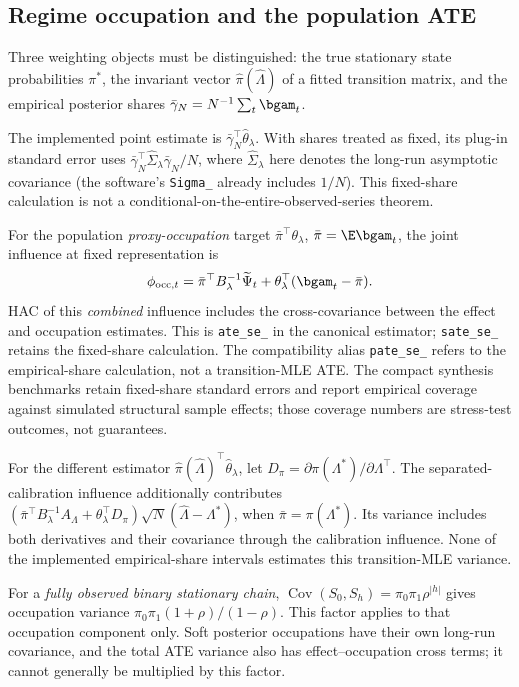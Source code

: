 \subsection{Regime occupation and the population ATE}
\label{app:proof_prop6}
Three weighting objects must be distinguished: the true stationary state probabilities $\pi^*$, the invariant vector $\hat\pi(\hat\Lambda)$ of a fitted transition matrix, and the empirical posterior shares $\bar\gamma_N=N^{-1}\sum_t\bgam_t$.

The implemented point estimate is $\bar\gamma_N^\top\hat\theta_\lambda$. With shares treated as fixed, its plug-in standard error uses $\bar\gamma_N^\top\hat\Sigma_\lambda\bar\gamma_N/N$, where $\hat\Sigma_\lambda$ here denotes the long-run asymptotic covariance (the software's \texttt{Sigma\_} already includes $1/N$). This fixed-share calculation is not a conditional-on-the-entire-observed-series theorem.

For the population \emph{proxy-occupation} target $\bar\pi^\top\theta_\lambda$, $\bar\pi=\E\bgam_t$, the joint influence at fixed representation is
\[
\phi_{{\rm occ},t}=\bar\pi^\top B_\lambda^{-1}\widetilde\Psi_t
+\theta_\lambda^\top(\bgam_t-\bar\pi).
\]
HAC of this \emph{combined} influence includes the cross-covariance between the effect and occupation estimates. This is \texttt{ate\_se\_} in the canonical estimator; \texttt{sate\_se\_} retains the fixed-share calculation. The compatibility alias \texttt{pate\_se\_} refers to the empirical-share calculation, not a transition-MLE ATE. The compact synthesis benchmarks retain fixed-share standard errors and report empirical coverage against simulated structural sample effects; those coverage numbers are stress-test outcomes, not guarantees.

For the different estimator $\hat\pi(\hat\Lambda)^\top\hat\theta_\lambda$, let $D_\pi=\partial\pi(\Lambda^*)/\partial\Lambda^\top$. The separated-calibration influence additionally contributes $(\bar\pi^\top B_\lambda^{-1}A_\Lambda+\theta_\lambda^\top D_\pi)\sqrt N(\hat\Lambda-\Lambda^*)$, when $\bar\pi=\pi(\Lambda^*)$. Its variance includes both derivatives and their covariance through the calibration influence. None of the implemented empirical-share intervals estimates this transition-MLE variance.

For a \emph{fully observed binary stationary chain}, $\operatorname{Cov}(S_0,S_h)=\pi_0\pi_1\rho^{|h|}$ gives occupation variance $\pi_0\pi_1(1+\rho)/(1-\rho)$. This factor applies to that occupation component only. Soft posterior occupations have their own long-run covariance, and the total ATE variance also has effect--occupation cross terms; it cannot generally be multiplied by this factor.

